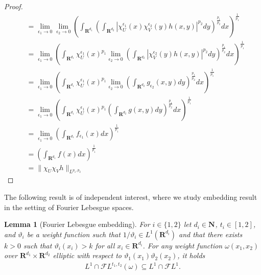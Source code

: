 \documentclass[a4paper]{article}
\newcommand{\nn}[1]{\mathbf{N}^{#1}}
\newcommand{\rr}[1]{\mathbf{R}^{#1}}
\newcommand{\rrI}{\rr{d_1}}
\newcommand{\rrII}{\rr{d_2}}
\newcommand{\rrIxII}{\rrI\times\rrII}
\newcommand{\norm}[2]{\|#1\|_{#2}}
\newcommand{\chF}[1]{\chi_{#1}}
\newcommand{\chE}[3]{\chF{#1}^{#2}(#3)}
\numberwithin{equation}{section}
\newtheorem{lemma}[theorem]{Lemma}
\theoremstyle{remark}
\begin{document}
\begin{proof}
\begin{align*}
        &=\lim_{\epsilon_1\to0}\lim_{\epsilon_2\to0}\left(\int_{\rrI}\left(\int_{\rrII}|\chE{U}{\epsilon_1}{x}\chE{V}{\epsilon_2}{y}h(x,y)|^{p_2}dy\right)^{\frac{p_1}{p_2}}dx\right)^{\frac{1}{p_1}}\\
        &=\lim_{\epsilon_1\to0}\left(\int_{\rrI}\chE{U}{\epsilon_1}{x}^{p_1}\lim_{\epsilon_2\to0}\left(\int_{\rrII}|\chE{V}{\epsilon_2}{y}h(x,y)|^{p_2}dy\right)^{\frac{p_1}{p_2}}dx\right)^{\frac{1}{p_1}}\\
        &=\lim_{\epsilon_1\to0}\left(\int_{\rrI}\chE{U}{\epsilon_1}{x}^{p_1}\lim_{\epsilon_2\to0}\left(\int_{\rrII}g_{\epsilon_2}(x,y)dy\right)^{\frac{p_1}{p_2}}dx\right)^{\frac{1}{p_1}}\\
        &=\lim_{\epsilon_1\to0}\left(\int_{\rrI}\chE{U}{\epsilon_1}{x}^{p_1}\left(\int_{\rrII}g(x,y)dy\right)^{\frac{p_1}{p_2}}dx\right)^{\frac{1}{p_1}}\\
        &=\lim_{\epsilon_1\to0}\left(\int_{\rrI}f_{\epsilon_1}(x)dx\right)^{\frac{1}{p_1}}\\
        &=\left(\int_{\rrI}f(x)dx\right)^{\frac{1}{p_1}}\\
        &=\norm{\chF{U}\chF{V}h}{L^{p_1,p_2}}
    \end{align*}
\end{proof}

The following result is of independent interest,  where we study embedding
result in the setting of Fourier Lebesgue spaces.
\begin{lemma}[Fourier Lebesgue embedding]
\label{lem:weighted_FLt_in_FL1}
    For \(i\in\{1,2\}\) let \(d_i\in\nn{}\), \(t_i\in[1,2]\), and \(\vartheta_i\) be a weight function such that \(1/\vartheta_i\in L^1(\rr{d_i})\)
    and that there exists $k>0$ such that
    \(\vartheta_i(x_i)>k\) for all \(x_i\in\rr{d_i}\).
    For any weight function \(\omega(x_1, x_2)\) over \(\rrIxII\)
    elliptic with respect to \(\vartheta_1(x_1)\vartheta_2(x_2)\),
    it holds
    \begin{align*}
        L^1\cap\mathscr{F}L^{t_1,t_2}(\omega)\subseteq L^1\cap\mathscr{F}L^1.
    \end{align*}
\end{lemma}
\end{document}
